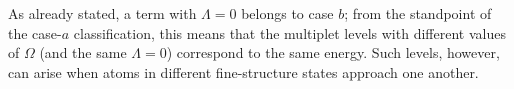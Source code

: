 As already stated, a term with $\Lambda=0$ belongs to case $b$; from the standpoint of the case-$a$ classification, this means that the multiplet levels with different values of $\Omega$ (and the same $\Lambda=0$) correspond to the same energy. Such levels, however,
can arise when atoms in different fine-structure states approach one another.
